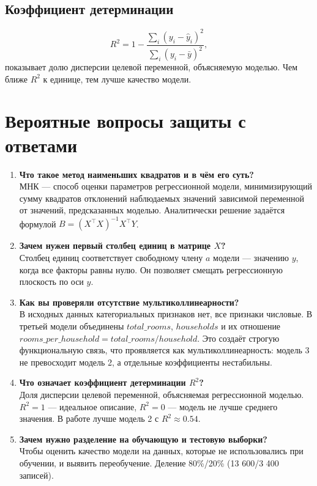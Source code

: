 \documentclass[12pt,a4paper]{article}
\begin{document}
\subsection{Коэффициент детерминации}
\begin{equation}
R^2 = 1 - \frac{\sum_i (y_i - \hat{y}_i)^2}{\sum_i (y_i - \bar{y})^2} ,
\end{equation}
показывает долю дисперсии целевой переменной, объясняемую моделью. Чем ближе $R^2$ к единице, тем лучше качество модели.

\section{Вероятные вопросы защиты с ответами}

\begin{enumerate}
\item \textbf{Что такое метод наименьших квадратов и в чём его суть?}\\
МНК --- способ оценки параметров регрессионной модели, минимизирующий сумму квадратов отклонений наблюдаемых значений зависимой переменной от значений, предсказанных моделью. Аналитически решение задаётся формулой $B = (X^\top X)^{-1}X^\top Y$.

\item \textbf{Зачем нужен первый столбец единиц в матрице $X$?}\\
Столбец единиц соответствует свободному члену $a$ модели --- значению $y$, когда все факторы равны нулю. Он позволяет смещать регрессионную плоскость по оси $y$.

\item \textbf{Как вы проверяли отсутствие мультиколлинеарности?}\\
В исходных данных категориальных признаков нет, все признаки числовые. В третьей модели объединены $total\_rooms$, $households$ и их отношение $rooms\_per\_household = total\_rooms/household$. Это создаёт строгую функциональную связь, что проявляется как мультиколлинеарность: модель 3 не превосходит модель 2, а отдельные коэффициенты нестабильны.

\item \textbf{Что означает коэффициент детерминации $R^2$?}\\
Доля дисперсии целевой переменной, объясняемая регрессионной моделью. $R^2 = 1$ --- идеальное описание, $R^2 = 0$ --- модель не лучше среднего значения. В работе лучше модель 2 с $R^2 \approx 0.54$.

\item \textbf{Зачем нужно разделение на обучающую и тестовую выборки?}\\
Чтобы оценить качество модели на данных, которые не использовались при обучении, и выявить переобучение. Деление 80\%/20\% (13 600/3 400 записей).


\end{enumerate}
\end{document}
